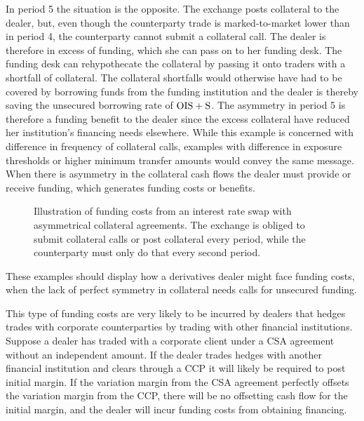 \documentclass[main.tex]{subfiles}
\begin{document}
\begin{example}
        In period 5 the situation is the opposite.
        The exchange posts collateral to the dealer, 
        but, even though the counterparty trade is marked-to-market lower than in period 4,
        the counterparty cannot submit a collateral call. 
        The dealer is therefore in excess of funding,
        which she can pass on to her funding desk.
        The funding desk can rehypothecate the collateral
        by passing it onto traders with a shortfall of collateral.
        The collateral shortfalls would otherwise have had to be covered by borrowing funds 
        from the funding institution and the dealer is thereby saving the unsecured borrowing rate of $\OIS/ + \text{S}$.
        The asymmetry in period 5 is therefore a funding benefit to the dealer
        since the excess collateral have reduced her institution's financing needs elsewhere.
        While this example is concerned with difference in frequency of collateral calls,
        examples with difference in exposure thresholds or higher minimum transfer amounts 
        would convey the same message.
        When there is asymmetry in the collateral cash flows the dealer must provide or receive funding,
        which generates funding costs or benefits.
        \end{example}

        \begin{figure}
            \centering
            \resizebox{\textwidth}{!}{%
            \begin{tikzpicture}
                
            \end{tikzpicture}        
            }   
            \caption{
                Illustration of funding costs from an interest rate swap with asymmetrical collateral agreements.
                The exchange is obliged to submit collateral calls or post collateral every period,
                while the counterparty must only do that every second period.
            }
            \label{fig:funding-costs-asymmetrical-csa}
        \end{figure}

        These examples should display how a derivatives dealer might face funding costs,
        when the lack of perfect symmetry in collateral needs calls for unsecured funding.

        This type of funding costs are very likely to be incurred by dealers that hedges 
        trades with corporate counterparties by trading with other financial institutions.
        Suppose a dealer has traded with a corporate client
        under a CSA agreement without an independent amount.
        If the dealer trades hedges with another financial institution
        and clears through a CCP it will likely be required to post initial margin. 
        If the variation margin from the CSA agreement 
        perfectly offsets the variation margin from the CCP, 
        there will be no offsetting cash flow for the initial margin,
        and the dealer will incur funding costs from obtaining financing.
        
\end{document}
